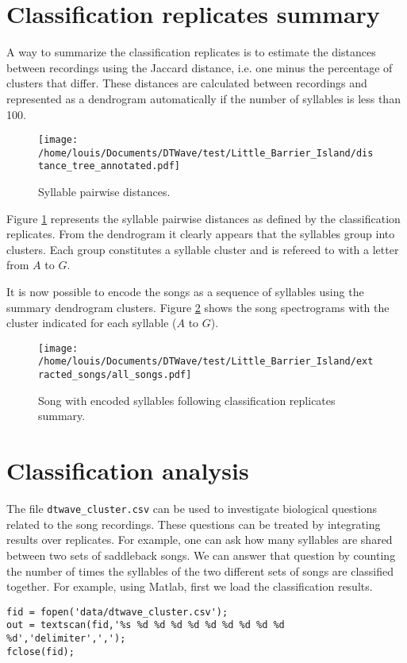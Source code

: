 \documentclass[a4paper]{article}
\begin{document}
\section{Classification replicates summary}
A way to summarize the classification replicates is to estimate the distances between recordings using the Jaccard distance, i.e. one minus the percentage of clusters that differ.
These distances are calculated between recordings and represented as a dendrogram automatically if the number of syllables is less than 100.

\begin{figure}[h!]
\begin{center}
\texttt{[image: /home/louis/Documents/DTWave/test/Little\_Barrier\_Island/distance\_tree\_annotated.pdf]}
\caption{Syllable pairwise distances.}
\end{center}
\label{fig:tree}
\end{figure}

Figure \ref{fig:tree} represents the syllable pairwise distances as defined by the classification replicates.
From the dendrogram it clearly appears that the syllables group into clusters.
Each group constitutes a syllable cluster and is refereed to with a letter from \(A\) to \(G\).

It is now possible to encode the songs as a sequence of syllables using the summary dendrogram clusters.
Figure \ref{fig:songs2} shows the song spectrograms with the cluster indicated for each syllable (\(A\) to \(G\)).

\begin{figure}[h!]
\begin{center}
\texttt{[image: /home/louis/Documents/DTWave/test/Little\_Barrier\_Island/extracted\_songs/all\_songs.pdf]}
\vspace{1cm}
\caption{Song with encoded syllables following classification replicates summary.}
\end{center}
\label{fig:songs2}
\end{figure}


\section{Classification analysis}
The file \texttt{dtwave\_cluster.csv} can be used to investigate biological questions related to the song recordings.
These questions can be treated by integrating results over replicates.
For example, one can ask how many syllables are shared between two sets of saddleback songs.
We can answer that question by counting the number of times the syllables of the two different sets of songs are classified together.
For example, using Matlab, first we load the classification results.
\begin{verbatim}
fid = fopen('data/dtwave_cluster.csv');
out = textscan(fid,'%s %d %d %d %d %d %d %d %d %d %d','delimiter',',');
fclose(fid);
\end{verbatim}
\end{document}
